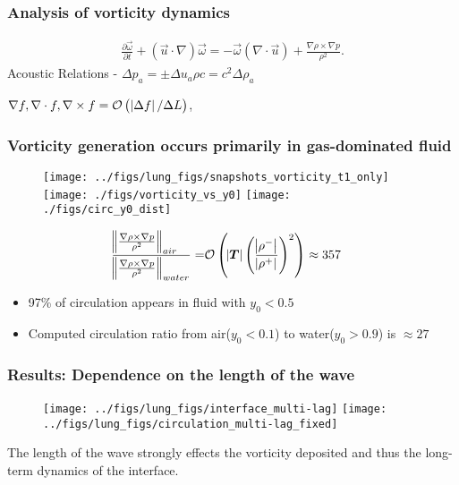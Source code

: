 \begin{frame} \frametitle{Analysis of vorticity dynamics}%
  \begin{align*}
    \frac{\partial \vec{\omega}}{\partial t}+\left(\vec{u}\cdot\nabla\right)\vec{\omega} =%
    - \vec{\omega}\left(\nabla\cdot\vec{u}\right) + \frac{\nabla\rho\times\nabla p}{\rho^2}.%
  \end{align*}
  Acoustic Relations - $\Delta p_a=\pm\Delta u_a \rho c=c^2\Delta \rho_a$

  $\nabla f, \nabla\cdot f, \nabla\times f= \mathcal{O}\left(\left|\Delta f\right|/\Delta L\right)$,


\end{frame}
\begin{frame} \frametitle{Vorticity generation occurs primarily in gas-dominated fluid}
  \vspace*{-.5cm}
  {\scriptsize
    \begin{figure}
      \centering
      \hfill
      \texttt{[image: ../figs/lung\_figs/snapshots\_vorticity\_t1\_only]} \hfill
      \texttt{[image: ./figs/vorticity\_vs\_y0]} \hfill
      \texttt{[image: ./figs/circ\_y0\_dist]}
      \hfill
    \end{figure}
    \vspace*{-.3cm}
    \begin{align*}%
      \frac{\norm{\frac{\nabla\rho\times\nabla p}{\rho^2}}_{air\quad}}{\norm{\frac{\nabla\rho\times\nabla p}{\rho^2}}_{water}}%
      =&\orderof{\abs{\boldsymbol{T}}\left(\frac{\abs{\rho^-}}{\abs{\rho^+}}\right)^2}%
         \approx 357
    \end{align*}
    \vspace*{-.25cm}
    \begin{itemize}
    \item 97\% of circulation appears in fluid with $y_0<0.5$
    \item Computed circulation ratio from air($y_0<0.1$) to water($y_0>0.9$) is $\approx 27$
    \end{itemize}
  }
\end{frame}
\begin{frame}\frametitle{ \vspace*{0.5cm} Results: Dependence on the length of the wave}
  \begin{figure}
    \centering
    \texttt{[image: ../figs/lung\_figs/interface\_multi-lag]}
    \texttt{[image: ../figs/lung\_figs/circulation\_multi-lag\_fixed]}
  \end{figure}
  The length of the wave strongly effects the vorticity deposited and
  thus the long-term dynamics of the interface.
\end{frame}
